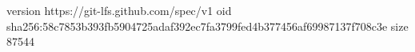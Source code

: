 version https://git-lfs.github.com/spec/v1
oid sha256:58c7853b393fb5904725adaf392ec7fa3799fed4b377456af69987137f708c3e
size 87544
